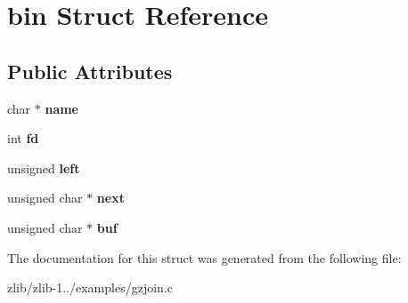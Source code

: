 \hypertarget{structbin}{\section{bin Struct Reference}
\label{structbin}
}
\subsection*{Public Attributes}
\begin{DoxyCompactItemize}
\item 
\hypertarget{structbin_a893b7ebf5a54ed6aac208eaa8d622881}{char $\ast$ {\bfseries name}}\label{structbin_a893b7ebf5a54ed6aac208eaa8d622881}

\item 
\hypertarget{structbin_a56e9c344a1bef0d4be37fa6c5ff2a28d}{int {\bfseries fd}}\label{structbin_a56e9c344a1bef0d4be37fa6c5ff2a28d}

\item 
\hypertarget{structbin_af8cc95dc82b46ee02858324c439c159b}{unsigned {\bfseries left}}\label{structbin_af8cc95dc82b46ee02858324c439c159b}

\item 
\hypertarget{structbin_a5b95d39116d468673d2c9fc38a9212db}{unsigned char $\ast$ {\bfseries next}}\label{structbin_a5b95d39116d468673d2c9fc38a9212db}

\item 
\hypertarget{structbin_ad3cd0b13d2a95bedcc3313327b873f6d}{unsigned char $\ast$ {\bfseries buf}}\label{structbin_ad3cd0b13d2a95bedcc3313327b873f6d}

\end{DoxyCompactItemize}


The documentation for this struct was generated from the following file\+:\begin{DoxyCompactItemize}
\item 
zlib/zlib-\/1../examples/gzjoin.\+c\end{DoxyCompactItemize}
